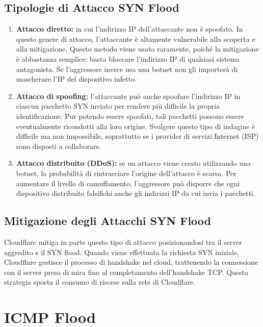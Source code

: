 \subsection{Tipologie di Attacco SYN Flood}

\begin{enumerate}
    \item \textbf{Attacco diretto:} in cui l'indirizzo IP dell'attaccante non è spoofato. In questo genere di attacco, l'attaccante è altamente vulnerabile alla scoperta e alla mitigazione. Questo metodo viene usato raramente, poiché la mitigazione è abbastanza semplice: basta bloccare l'indirizzo IP di qualsiasi sistema antagonista. Se l'aggressore invece usa una botnet non gli importerà di mascherare l'IP del dispositivo infetto.
    
    \item \textbf{Attacco di spoofing:} l'attaccante può anche spoofare l'indirizzo IP in ciascun pacchetto SYN inviato per rendere più difficile la propria identificazione. Pur potendo essere spoofati, tali pacchetti possono essere eventualmente ricondotti alla loro origine. Svolgere questo tipo di indagine è difficile ma non impossibile, soprattutto se i provider di servizi Internet (ISP) sono disposti a collaborare.
    
    \item \textbf{Attacco distribuito (DDoS):} se un attacco viene creato utilizzando una botnet, la probabilità di rintracciare l'origine dell'attacco è scarsa. Per aumentare il livello di camuffamento, l'aggressore può disporre che ogni dispositivo distribuito falsifichi anche gli indirizzi IP da cui invia i pacchetti.
\end{enumerate}

\subsection{Mitigazione degli Attacchi SYN Flood}

Cloudflare mitiga in parte questo tipo di attacco posizionandosi tra il server aggredito e il SYN flood. Quando viene effettuata la richiesta SYN iniziale, Cloudflare gestisce il processo di handshake nel cloud, trattenendo la connessione con il server preso di mira fino al completamento dell'handshake TCP. Questa strategia sposta il consumo di risorse sulla rete di Cloudflare.

\section{ICMP Flood}

